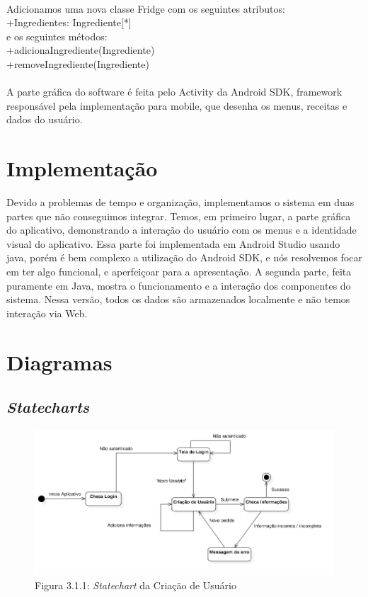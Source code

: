 \documentclass{article}
\begin{document}
\paragraph{}Adicionamos uma nova classe Fridge com os seguintes atributos:
\\ +Ingredientes: Ingrediente[*]
\\e os seguintes métodos:
\\ +adicionaIngrediente(Ingrediente)
\\ +removeIngrediente(Ingrediente)

\paragraph{}A parte gráfica do software é feita pelo Activity da Android SDK, framework responsável pela implementação para mobile, que desenha os menus, receitas e dados do usuário.


\section{Implementação}
Devido a problemas de tempo e organização, implementamos o sistema em duas partes que não conseguimos integrar. Temos, em primeiro lugar, a parte gráfica do aplicativo, demonstrando a interação do usuário com os menus e a identidade visual do aplicativo. Essa parte foi implementada em Android Studio usando java, porém é bem complexo a utilização do Android SDK, e nós resolvemos focar em ter algo funcional, e aperfeiçoar para a apresentação. A segunda parte, feita puramente em Java, mostra o funcionamento e a interação dos componentes do sistema.
Nessa versão, todos os dados são armazenados localmente e não temos interação via Web.

\newpage

\section{Diagramas}
\subsection{\emph{Statecharts}}

\begin{figure}[p]
	\centering
	\includegraphics[scale=0.5]{state_charts/criausuario.png}
  \captionsetup{labelformat=empty}
  \caption{Figura 3.1.1: \emph{Statechart} da Criação de Usuário}
\end{figure}
\end{document}

